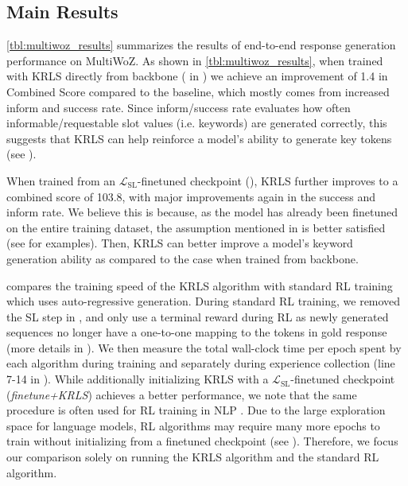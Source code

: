 \subsection{Main Results}
\label{subsec:Main Results}
\autoref{tbl:multiwoz_results} summarizes the results of end-to-end response generation performance on MultiWoZ. As shown in \autoref{tbl:multiwoz_results}, when trained with KRLS directly from backbone ( in ) we achieve an improvement of 1.4 in Combined Score compared to the baseline, which mostly comes from increased inform and success rate. 
Since inform/success rate evaluates how often informable/requestable slot values (i.e. keywords) are generated correctly, this suggests that KRLS can help reinforce a model's ability to generate key tokens (see ).

When trained from an $\mathcal{L}_{\mathrm{SL}}$-finetuned checkpoint (), KRLS further improves to a combined score of 103.8, with major improvements again in the success and inform rate. We believe this is because, as the model has already been finetuned on the entire training dataset, the assumption mentioned in  is better satisfied (see  for examples). 
Then, KRLS can better improve a model's keyword generation ability as compared to the case when trained from backbone.

 compares the training speed of the KRLS algorithm with standard RL training which uses auto-regressive generation.
During standard RL training, we removed the SL step in , and only use a terminal reward during RL as newly generated sequences no longer have a one-to-one mapping to the tokens in gold response (more details in ).
We then measure the total wall-clock time per epoch spent by each algorithm during training and separately during experience collection (line 7-14 in ).
While additionally initializing KRLS with a $\mathcal{L}_{\mathrm{SL}}$-finetuned checkpoint (\emph{finetune+KRLS}) achieves a better performance, we note that the same procedure is often used for RL training in NLP \cite{rl4lm}. Due to the large exploration space for language models, RL algorithms may require many more epochs to train without initializing from a finetuned checkpoint (see ). Therefore, we focus our comparison solely on running the KRLS algorithm and the standard RL algorithm.

